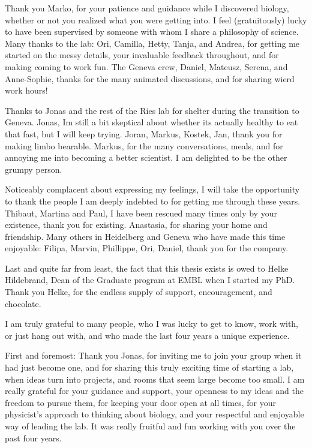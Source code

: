 \documentclass[
12pt, %
ngerman,
english, %
onehalfspacing,
hidelinks,
toctotoc, %
headsepline, %
]{MastersDoctoralThesis} %
\begin{document}
\begin{acknowledgements}

Thank you Marko, for your patience and guidance while I discovered biology, whether or not you realized what you were getting into. I feel (gratuitously) lucky to have been supervised by someone with whom I share a philosophy of science. Many thanks to the lab: Ori, Camilla, Hetty, Tanja, and Andrea, for getting me started on the messy details, your invaluable feedback throughout, and for making coming to work fun. The Geneva crew, Daniel, Mateusz, Serena, and Anne-Sophie, thanks for the many animated discussions, and for sharing wierd work hours! 

Thanks to Jonas and the rest of the Ries lab for shelter during the transition to Geneva. Jonas, Im still a bit skeptical about whether its actually healthy to eat that fast, but I will keep trying. Joran, Markus, Kostek, Jan, thank you for making limbo bearable. Markus, for the many conversations, meals, and for annoying me into becoming a better scientist. I am delighted to be the other grumpy person. 

Noticeably complacent about expressing my feelings, I will take the opportunity to thank the people I am deeply indebted to for getting me through these years. Thibaut, Martina and Paul, I have been rescued many times only by your existence, thank you for existing. Anastasia, for sharing your home and friendship. Many others in Heidelberg and Geneva who have made this time enjoyable: Filipa, Marvin, Phillippe, Ori, Daniel, thank you for the company.

Last and quite far from least, the fact that this thesis exists is owed to Helke Hildebrand, Dean of the Graduate program at EMBL when I started my PhD. Thank you Helke, for the endless supply of support, encouragement, and chocolate. 



I am truly grateful to many people, who I was lucky to get to know, work with, or just hang out with, and who made the last four years a unique experience.

First and foremost: Thank you Jonas, for inviting me to join your group when it had just become one, and for sharing this truly exciting time of starting a lab, when ideas turn into projects, and rooms that seem large become too small. I am really grateful for your guidance and support, your openness to my ideas and the freedom to pursue them, for keeping your door open at all times, for your physicist's approach to thinking about biology, and your respectful and enjoyable way of leading the lab. It was really fruitful and fun working with you over the past four years. 


\end{acknowledgements}
\end{document}
